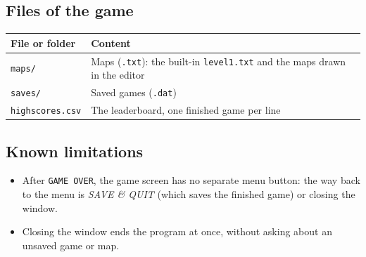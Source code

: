 \documentclass[11pt, a4paper]{article}
\begin{document}
\subsection*{Files of the game}
\begin{tabular}{@{}ll@{}}
    \toprule
    \textbf{File or folder} & \textbf{Content} \\
    \midrule
    \texttt{maps/} & Maps (\texttt{.txt}): the built-in \texttt{level1.txt} and the maps drawn in the editor \\
    \texttt{saves/} & Saved games (\texttt{.dat}) \\
    \texttt{highscores.csv} & The leaderboard, one finished game per line \\
    \bottomrule
\end{tabular}

\subsection*{Known limitations}
\begin{itemize}
    \item After \texttt{GAME OVER}, the game screen has no separate menu button: the way back to the menu is \textit{SAVE \& QUIT} (which saves the finished game) or closing the window.
    \item Closing the window ends the program at once, without asking about an unsaved game or map.
\end{itemize}
\end{document}
